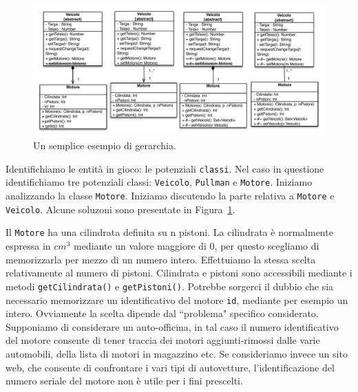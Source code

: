 \documentclass{article}
\begin{document}
\begin{figure}[h!]
  \centering
    \includegraphics[width=1\textwidth]{Img/motoreveicolo.pdf}
      \caption{Un semplice esempio di gerarchia.}
      \label{Fig:motoreveicolo}
\end{figure}
Identifichiamo le entit\`a in gioco: le potenziali \texttt{classi}. Nel caso in questione identifichiamo tre potenziali classi: \texttt{Veicolo}, \texttt{Pullman} e \texttt{Motore}. Iniziamo analizzando la classe \texttt{Motore}.
Iniziamo discutendo la parte relativa a \texttt{Motore} e  \texttt{Veicolo}. Alcune soluzoni sono presentate in Figura~\ref{Fig:motoreveicolo}.

Il \texttt{Motore} ha una cilindrata definita su n pistoni. La cilindrata \`e normalmente espressa in $cm^3$ mediante un valore maggiore di $0$, per questo scegliamo di memorizzarla per mezzo di un numero intero. Effettuiamo la stessa scelta relativamente al numero di pistoni. Cilindrata e pistoni sono accessibili mediante i metodi \texttt{getCilindrata()} e \texttt{getPistoni()}. Potrebbe sorgerci il dubbio che sia necessario memorizzare un identificativo del motore \texttt{id}, mediante per esempio un intero. Ovviamente la scelta dipende dal ``problema" specifico considerato. Supponiamo di considerare un auto-officina, in tal caso il numero identificativo del motore consente di tener traccia dei motori aggiunti-rimossi dalle varie automobili, della lista di motori in magazzino etc. Se consideriamo invece un sito web, che consente di confrontare i vari tipi di autovetture, l'identificazione del numero seriale del motore non \`e utile per i fini prescelti.
\end{document}
